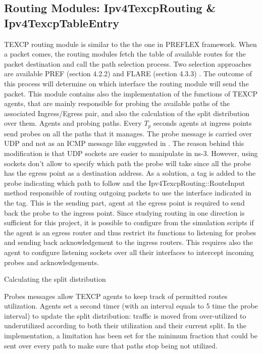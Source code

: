  		\subsection{Routing Modules: Ipv4TexcpRouting & Ipv4TexcpTableEntry}

TEXCP routing module is similar to the  the one in PREFLEX framework. When a packet comes, the routing modules fetch the table of available routes for the packet destination and call the path selection process. Two selection approaches are available PREF (section 4.2.2) and FLARE (section 4.3.3) . The outcome of this process will determine on which interface the routing module will send the packet.  This module contains also the implementation of the functions of TEXCP agents, that are mainly responsible for probing the available paths of the associated Ingress/Egress pair, and also the calculation of the split distribution over them.
Agents and probing paths.
Every $T_p$ seconds agents at ingress points send probes on all the paths that it manages.  The probe message is carried over UDP and not as an ICMP message like suggested in \cite{kan1}. The reason behind this modification is that UDP sockets are easier to manipulate in ns-3. However, using sockets don't allow to specify which path the probe will take since all the probe has the egress point as a destination address. As a solution, a tag is added to the probe indicating which path to follow and the Ipv4TexcpRouting::RouteInput method responsible of routing outgoing packets to use the interface indicated in the tag. This is the sending part, agent at the egress point is required to send back the probe to the ingress point. Since studying routing in one direction is sufficient for this project, it is possible to configure from the simulation scripts if the agent is an egress router and thus restrict its functions to listening for probes and sending back acknowledgement to the ingress routers. This requires also the agent to configure listening sockets over all their interfaces to intercept incoming probes and acknowledgements.

Calculating the split distribution 

Probes messages allow TEXCP agents to keep  track of permitted routes utilization. Agents set a second timer (with an interval equals to 5 time the probe interval) to update the split distribution: traffic is moved from over-utilized to underutilized according to both their utilization and their current split. In the implementation, a limitation has been set for the minimum fraction that could be sent over every path to make sure that paths stop being not utilized.

